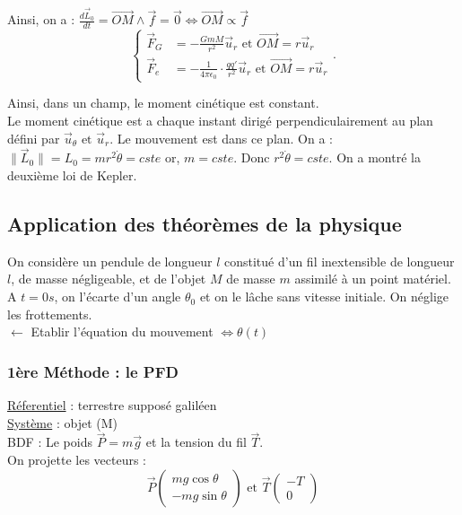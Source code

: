 \documentclass{article}
\begin{document}
Ainsi, on a : $\frac{d\vec{L}_0}{dt} = \vec{OM}\wedge \vec{f} = \vec{0}\iff \vec{OM}\propto \vec{f}$\\

\[
\begin{cases}
    \vec{F}_G &= -\frac{GmM}{r^2}\vec{u}_r \text{ et } \vec{OM} = r\vec{u}_r\\
    \vec{F}_e &= - \frac{1}{4\pi \epsilon_0} \cdot \frac{qq'}{r^2}\vec{u}_r \text{ et } \vec{OM} = r\vec{u}_r
\end{cases}
.\] 


Ainsi, dans un champ, le moment cinétique est constant.\\
Le moment cinétique est a chaque instant dirigé perpendiculairement au plan défini par \(\vec{u}_\theta \text{ et }\vec{u}_r\). Le mouvement est dans ce plan. On a :\\
\(\|\vec{L}_0\| = L_0 = mr^2\dot{\theta } = cste \) or, \(m = cste\). Donc \(r^2\dot{\theta } = cste\). On a montré la deuxième loi de Kepler. 

\subsection{Application des théorèmes de la physique}

On considère un pendule de longueur \(l\) constitué d'un fil inextensible de longueur \(l\), de masse négligeable, et de l'objet \(M\) de masse \(m\) assimilé à un point matériel.\\
A \(t=0s\), on l'écarte d'un angle \(\theta_0\) et on le lâche sans vitesse initiale. On néglige les frottements.\\
\(\leftarrow\) Etablir l'équation du mouvement \(\iff \theta(t)\)
\subsubsection{1ère Méthode : le PFD} 
\underline{Réferentiel} : terrestre supposé galiléen\\
\underline{Système} : {objet (M)}\\
BDF : Le poids \(\vec{P} = m\vec{g}\) et la tension du fil \(\vec{T}\).\\

On projette les vecteurs : \\
\begin{equation*}
   \vec{P}\begin{pmatrix} mg \cos\theta \\ -mg \sin\theta\end{pmatrix} \text{ et } \vec{T}\begin{pmatrix} -T\\ 0 \end{pmatrix} 
\end{equation*}
\end{document}
